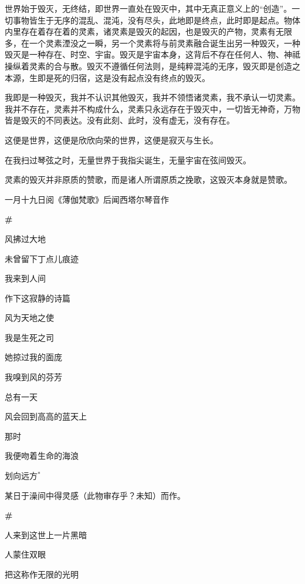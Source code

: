 \documentclass{ctexbook}
\begin{document}
\mbox


    世界始于毁灭，无终结，即世界一直处在毁灭中，其中无真正意义上的“创造”。一切事物皆生于无序的混乱、混沌，没有尽头，此地即是终点，此时即是起点。物体内里存在着存在着的灵素，诸灵素是毁灭的起因，也是毁灭的产物，灵素有无限多，在一个灵素湮没之一瞬，另一个灵素将与前灵素融合诞生出另一种毁灭，一种毁灭是一种存在、时空、宇宙。毁灭是宇宙本身，这背后不存在任何人、物、神祗操纵着灵素的合与散。毁灭不遵循任何法则，是纯粹混沌的无序，毁灭即是创造之本源，生即是死的归宿，这是没有起点没有终点的毁灭。

    我即是一种毁灭，我并不认识其他毁灭，我并不领悟诸灵素，我不承认一切灵素。我并不存在，灵素并不构成什么，灵素只永远存在于毁灭中，一切皆无神奇，万物皆是毁灭的不同表达。没有此刻、此时，没有虚无，没有存在。

    这便是世界，这便是欣欣向荣的世界，这便是寂灭与生长。

    在我扫过琴弦之时，无量世界于我指尖诞生，无量宇宙在弦间毁灭。

    灵素的毁灭并非原质的赞歌，而是诸人所谓原质之挽歌，这毁灭本身就是赞歌。


\mbox


    \hfill{一月十九日阅《薄伽梵歌》后闻西塔尔琴音作}

\newpage
\textbf{\#}


\mbox


    风拂过大地

    未曾留下丁点儿痕迹

    我来到人间

    作下这寂静的诗篇

    风为天地之使

    我是生死之司

    她掠过我的面庞

    我嗅到风的芬芳

    总有一天

    风会回到高高的蓝天上

    那时

    我便吻着生命的海浪

    划向远方\(^*\)


\mbox


    {\normalsize *某日于澡间中得灵感（此物审存乎？未知）而作。}

\newpage
\textbf{\#}


\mbox


    人来到这世上一片黑暗

    人蒙住双眼

    把这称作无限的光明
\end{document}
